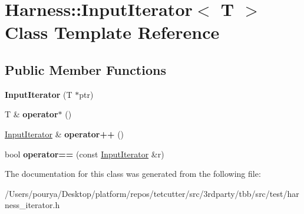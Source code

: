 \hypertarget{classHarness_1_1InputIterator}{}\section{Harness\+:\+:Input\+Iterator$<$ T $>$ Class Template Reference}
\label{classHarness_1_1InputIterator}
\subsection*{Public Member Functions}
\begin{DoxyCompactItemize}
\item 
\hypertarget{classHarness_1_1InputIterator_a0ed897f23ecfa911fa1fd509c8491f9d}{}{\bfseries Input\+Iterator} (T $\ast$ptr)\label{classHarness_1_1InputIterator_a0ed897f23ecfa911fa1fd509c8491f9d}

\item 
\hypertarget{classHarness_1_1InputIterator_a727daf7463c928d143f44819b2e501cb}{}T \& {\bfseries operator$\ast$} ()\label{classHarness_1_1InputIterator_a727daf7463c928d143f44819b2e501cb}

\item 
\hypertarget{classHarness_1_1InputIterator_a555fdce8014a784bef31051a6c66dce3}{}\hyperlink{classHarness_1_1InputIterator}{Input\+Iterator} \& {\bfseries operator++} ()\label{classHarness_1_1InputIterator_a555fdce8014a784bef31051a6c66dce3}

\item 
\hypertarget{classHarness_1_1InputIterator_a4c059d43960ae7fa4d7917990b00a922}{}bool {\bfseries operator==} (const \hyperlink{classHarness_1_1InputIterator}{Input\+Iterator} \&r)\label{classHarness_1_1InputIterator_a4c059d43960ae7fa4d7917990b00a922}

\end{DoxyCompactItemize}


The documentation for this class was generated from the following file\+:\begin{DoxyCompactItemize}
\item 
/\+Users/pourya/\+Desktop/platform/repos/tetcutter/src/3rdparty/tbb/src/test/harness\+\_\+iterator.\+h\end{DoxyCompactItemize}
